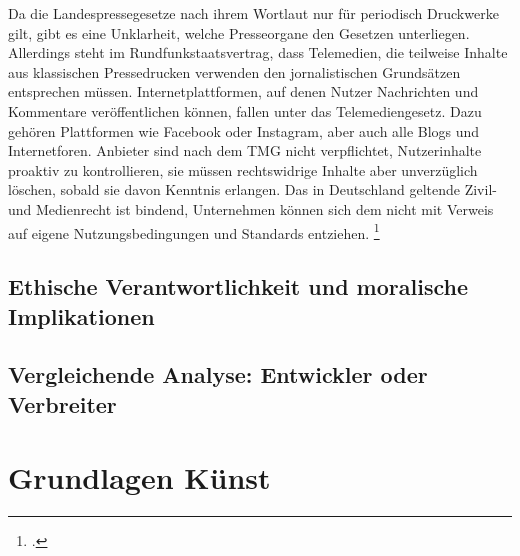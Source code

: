 \documentclass[Thesis.tex]{subfiles}
\begin{document}
Da die Landespressegesetze nach ihrem Wortlaut nur für periodisch Druckwerke gilt,
 gibt es eine Unklarheit, welche Presseorgane den Gesetzen unterliegen. Allerdings
steht im Rundfunkstaatsvertrag, dass Telemedien, die teilweise Inhalte aus klassischen
Pressedrucken verwenden den jornalistischen Grundsätzen entsprechen müssen. 
Internetplattformen, auf denen Nutzer Nachrichten und Kommentare veröffentlichen können,
fallen unter das Telemediengesetz. Dazu gehören Plattformen wie Facebook oder Instagram,
aber auch alle Blogs und Internetforen. Anbieter sind nach dem TMG nicht verpflichtet,
Nutzerinhalte proaktiv zu kontrollieren, sie müssen rechtswidrige Inhalte aber unverzüglich löschen,
sobald sie davon Kenntnis erlangen. Das in Deutschland geltende Zivil- und Medienrecht ist bindend,
Unternehmen können sich dem nicht mit Verweis auf eigene Nutzungsbedingungen und Standards entziehen. \footcite{DBWDUmgangmitFakenews} %
   \subsection{Ethische Verantwortlichkeit und moralische Implikationen}

\subsection{Vergleichende Analyse: Entwickler oder Verbreiter}

\section{Grundlagen Künst}
\end{document}
